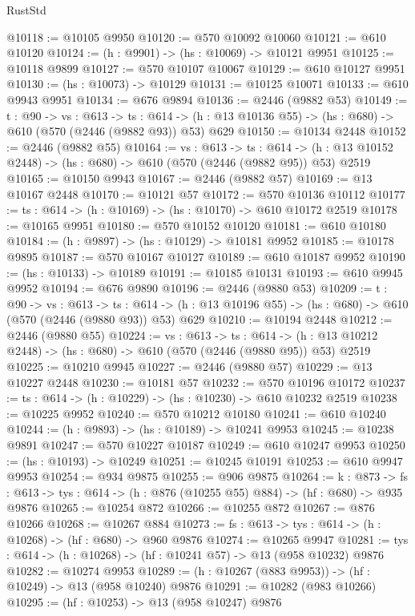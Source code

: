 \begin{lexlean}{RustStd}
\begin{coremodule}
@10118 := @10105 @9950
@10120 := @570 @10092 @10060
@10121 := @610 @10120
@10124 := (h : @9901) -> (hs : @10069) -> @10121 @9951
@10125 := @10118 @9899
@10127 := @570 @10107 @10067
@10129 := @610 @10127 @9951
@10130 := (hs : @10073) -> @10129
@10131 := @10125 @10071
@10133 := @610 @9943 @9951
@10134 := @676 @9894
@10136 := @2446 (@9882 @53)
@10149 := {t : @90} ->
  {vs : @613} ->
  {ts : @614} -> (h : @13 @10136 @55) -> (hs : @680) -> @610 (@570 (@2446 (@9882 @93)) @53) @629
@10150 := @10134 @2448
@10152 := @2446 (@9882 @55)
@10164 := {vs : @613} ->
  {ts : @614} -> (h : @13 @10152 @2448) -> (hs : @680) -> @610 (@570 (@2446 (@9882 @95)) @53) @2519
@10165 := @10150 @9943
@10167 := @2446 (@9882 @57)
@10169 := @13 @10167 @2448
@10170 := @10121 @57
@10172 := @570 @10136 @10112
@10177 := {ts : @614} -> (h : @10169) -> (hs : @10170) -> @610 @10172 @2519
@10178 := @10165 @9951
@10180 := @570 @10152 @10120
@10181 := @610 @10180
@10184 := (h : @9897) -> (hs : @10129) -> @10181 @9952
@10185 := @10178 @9895
@10187 := @570 @10167 @10127
@10189 := @610 @10187 @9952
@10190 := (hs : @10133) -> @10189
@10191 := @10185 @10131
@10193 := @610 @9945 @9952
@10194 := @676 @9890
@10196 := @2446 (@9880 @53)
@10209 := {t : @90} ->
  {vs : @613} ->
  {ts : @614} -> (h : @13 @10196 @55) -> (hs : @680) -> @610 (@570 (@2446 (@9880 @93)) @53) @629
@10210 := @10194 @2448
@10212 := @2446 (@9880 @55)
@10224 := {vs : @613} ->
  {ts : @614} -> (h : @13 @10212 @2448) -> (hs : @680) -> @610 (@570 (@2446 (@9880 @95)) @53) @2519
@10225 := @10210 @9945
@10227 := @2446 (@9880 @57)
@10229 := @13 @10227 @2448
@10230 := @10181 @57
@10232 := @570 @10196 @10172
@10237 := {ts : @614} -> (h : @10229) -> (hs : @10230) -> @610 @10232 @2519
@10238 := @10225 @9952
@10240 := @570 @10212 @10180
@10241 := @610 @10240
@10244 := (h : @9893) -> (hs : @10189) -> @10241 @9953
@10245 := @10238 @9891
@10247 := @570 @10227 @10187
@10249 := @610 @10247 @9953
@10250 := (hs : @10193) -> @10249
@10251 := @10245 @10191
@10253 := @610 @9947 @9953
@10254 := @934 @9875
@10255 := @906 @9875
@10264 := {k : @873} ->
  {fs : @613} -> {tys : @614} -> (h : @876 (@10255 @55) @884) -> (hf : @680) -> @935 @9876
@10265 := @10254 @872
@10266 := @10255 @872
@10267 := @876 @10266
@10268 := @10267 @884
@10273 := {fs : @613} -> {tys : @614} -> (h : @10268) -> (hf : @680) -> @960 @9876
@10274 := @10265 @9947
@10281 := {tys : @614} -> (h : @10268) -> (hf : @10241 @57) -> @13 (@958 @10232) @9876
@10282 := @10274 @9953
@10289 := (h : @10267 (@883 @9953)) -> (hf : @10249) -> @13 (@958 @10240) @9876
@10291 := @10282 (@983 @10266)
@10295 := (hf : @10253) -> @13 (@958 @10247) @9876

\end{coremodule}
\end{lexlean}
